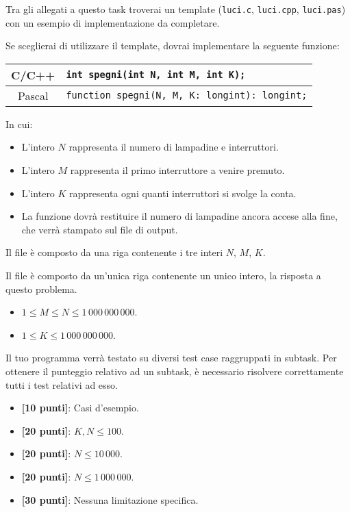 \begin{warning}
Tra gli allegati a questo task troverai un template (\texttt{luci.c}, \texttt{luci.cpp}, \texttt{luci.pas}) con un esempio di implementazione da completare.
\end{warning}

Se sceglierai di utilizzare il template, dovrai implementare la seguente funzione:
\begin{center}\begin{tabularx}{\textwidth}{|c|X|}
\hline
C/C++  & \verb|int spegni(int N, int M, int K);|\\
\hline
Pascal & \verb|function spegni(N, M, K: longint): longint;|\\
\hline
\end{tabularx}\end{center}
In cui:
\begin{itemize}[nolistsep]
  \item L'intero $N$ rappresenta il numero di lampadine e interruttori.
  \item L'intero $M$ rappresenta il primo interruttore a venire premuto.
  \item L'intero $K$ rappresenta ogni quanti interruttori si svolge la conta.
  \item La funzione dovrà restituire il numero di lampadine ancora accese alla fine, che verrà stampato sul file di output.
\end{itemize}

\InputFile
Il file  è composto da una riga contenente i tre interi $N$, $M$, $K$.

\OutputFile
Il file \outputfile{} è composto da un'unica riga contenente un unico intero, la risposta a questo problema.

\pagebreak
\Constraints
\begin{itemize}[nolistsep, itemsep=2mm]
	\item $1 \le M \le N \le 1\,000\,000\,000$.
	\item $1 \le K \le 1\,000\,000\,000$.
\end{itemize}

\Scoring
Il tuo programma verrà testato su diversi test case raggruppati in subtask.
Per ottenere il punteggio relativo ad un subtask, è necessario risolvere
correttamente tutti i test relativi ad esso.

\begin{itemize}[nolistsep,itemsep=2mm]
  \item \textbf{ [10 punti]}: Casi d'esempio.
  \item \textbf{ [20 punti]}: $K, N \leq 100$.
  \item \textbf{ [20 punti]}: $N \leq 10\,000$.
  \item \textbf{ [20 punti]}: $N \leq 1\,000\,000$.
  \item \textbf{ [30 punti]}: Nessuna limitazione specifica.
\end{itemize}

